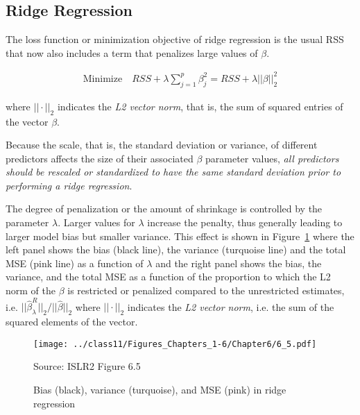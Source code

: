 \subsection{Ridge Regression}

The loss function or minimization objective of ridge regression is the usual RSS that now also includes a term that penalizes large values of $\beta$. 

\begin{align*}
\text{Minimize} \quad RSS + \lambda \sum_{j=1}^p \beta_j^2 = RSS + \lambda ||\beta||_2^2
\end{align*}

\noindent where $||\cdot||_2$ indicates the \emph{L2 vector norm}, that is, the sum of squared entries of the vector $\beta$. 

Because the scale, that is, the standard deviation or variance, of different predictors affects the size of their associated $\beta$ parameter values, \emph{all predictors should be rescaled or standardized to have the same standard deviation prior to performing a ridge regression}. 

The degree of penalization or the amount of shrinkage is controlled by the parameter $\lambda$. Larger values for $\lambda$ increase the penalty, thus generally leading to larger model bias but smaller variance. This effect is shown in Figure~\ref{fig:ridgebias} where the left panel shows the bias (black line), the variance (turquoise line) and the total MSE (pink line) as a function of $\lambda$ and the right panel shows the bias, the variance, and the total MSE as a function of the proportion to which the L2 norm of the $\beta$ is restricted or penalized compared to the unrestricted estimates, i.e. $||\hat{\beta}^R_\lambda||_2 / ||\hat{\beta}||_2$ where $||\cdot||_2$ indicates the \emph{L2 vector norm}, i.e. the sum of the squared elements of the vector.

\begin{figure}
\centering
\texttt{[image: ../class11/Figures\_Chapters\_1-6/Chapter6/6\_5.pdf]}

\scriptsize Source: ISLR2 Figure 6.5 \normalsize \\

\caption[Bias, variance, and MSE in ridge regression]{Bias (black), variance (turquoise), and MSE (pink) in ridge regression}
\label{fig:ridgebias}
\end{figure}

